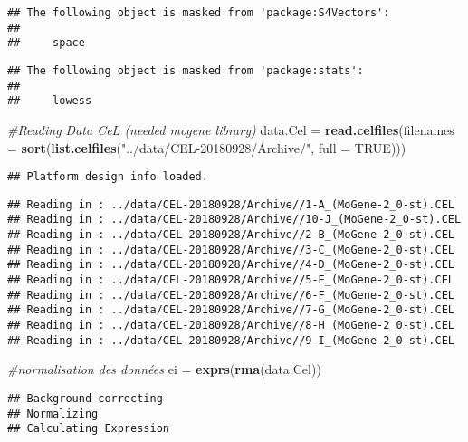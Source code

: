 \documentclass[]{article}
\newenvironment{Shaded}{\begin{snugshade}}{\end{snugshade}}
\newcommand{\KeywordTok}[1]{\textcolor[rgb]{0.13,0.29,0.53}{\textbf{#1}}}
\newcommand{\DataTypeTok}[1]{\textcolor[rgb]{0.13,0.29,0.53}{#1}}
\newcommand{\StringTok}[1]{\textcolor[rgb]{0.31,0.60,0.02}{#1}}
\newcommand{\CommentTok}[1]{\textcolor[rgb]{0.56,0.35,0.01}{\textit{#1}}}
\newcommand{\OtherTok}[1]{\textcolor[rgb]{0.56,0.35,0.01}{#1}}
\newcommand{\NormalTok}[1]{#1}
\begin{document}
\begin{verbatim}
## The following object is masked from 'package:S4Vectors':
## 
##     space
\end{verbatim}

\begin{verbatim}
## The following object is masked from 'package:stats':
## 
##     lowess
\end{verbatim}

\begin{Shaded}
\begin{Highlighting}[]
\CommentTok{#Reading Data CeL (needed mogene library)}
\NormalTok{data.Cel =}\StringTok{ }\KeywordTok{read.celfiles}\NormalTok{(}\DataTypeTok{filenames =} \KeywordTok{sort}\NormalTok{(}\KeywordTok{list.celfiles}\NormalTok{(}\StringTok{"../data/CEL-20180928/Archive/"}\NormalTok{, }\DataTypeTok{full =} \OtherTok{TRUE}\NormalTok{)))}
\end{Highlighting}
\end{Shaded}

\begin{verbatim}
## Platform design info loaded.
\end{verbatim}

\begin{verbatim}
## Reading in : ../data/CEL-20180928/Archive//1-A_(MoGene-2_0-st).CEL
## Reading in : ../data/CEL-20180928/Archive//10-J_(MoGene-2_0-st).CEL
## Reading in : ../data/CEL-20180928/Archive//2-B_(MoGene-2_0-st).CEL
## Reading in : ../data/CEL-20180928/Archive//3-C_(MoGene-2_0-st).CEL
## Reading in : ../data/CEL-20180928/Archive//4-D_(MoGene-2_0-st).CEL
## Reading in : ../data/CEL-20180928/Archive//5-E_(MoGene-2_0-st).CEL
## Reading in : ../data/CEL-20180928/Archive//6-F_(MoGene-2_0-st).CEL
## Reading in : ../data/CEL-20180928/Archive//7-G_(MoGene-2_0-st).CEL
## Reading in : ../data/CEL-20180928/Archive//8-H_(MoGene-2_0-st).CEL
## Reading in : ../data/CEL-20180928/Archive//9-I_(MoGene-2_0-st).CEL
\end{verbatim}

\begin{Shaded}
\begin{Highlighting}[]
\CommentTok{#normalisation des données}
\NormalTok{ei =}\StringTok{ }\KeywordTok{exprs}\NormalTok{(}\KeywordTok{rma}\NormalTok{(data.Cel))}
\end{Highlighting}
\end{Shaded}

\begin{verbatim}
## Background correcting
## Normalizing
## Calculating Expression
\end{verbatim}
\end{document}
